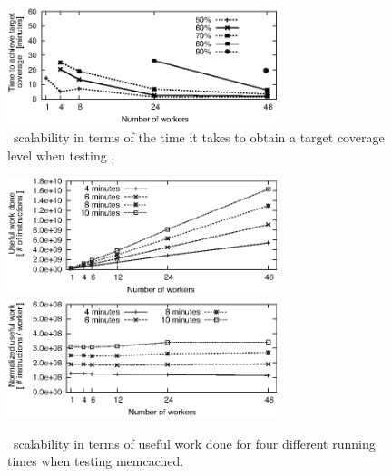 \begin{figure}
  \centering   \includegraphics[width=0.7\textwidth]{evaluation/graphs/cloud9/scalab-time-vs-workers-cov-printf-edited}
\caption{\cnine\ scalability in terms of the time it takes to obtain a target coverage level when testing .}
\label{fig:scalab-time-vs-workers-cov}
\end{figure}

\begin{figure}
  \centering
  \includegraphics[width=0.7\textwidth]{evaluation/graphs/cloud9/scalab-thr-cpu-vs-workers-memcached-edited} \\ \includegraphics[width=0.7\textwidth]{evaluation/graphs/cloud9/scalab-thr-cpu-perc-vs-workers-memcached-edited}
  \caption{\cnine\ scalability in terms of useful work done for four different running times when testing memcached.}
  \label{fig:scalab-memcached}
\end{figure}

